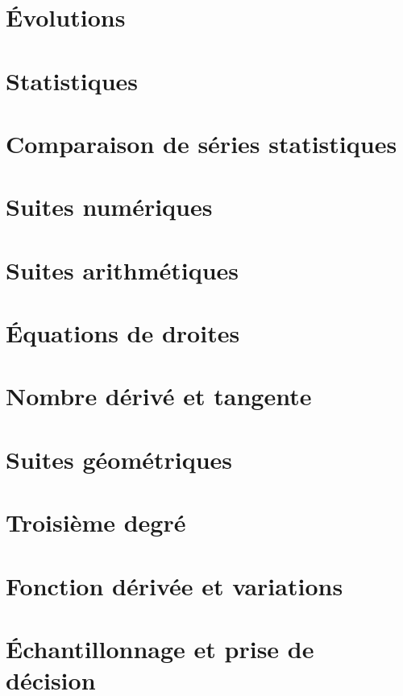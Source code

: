 \documentclass[a4paper,12pt]{book}
\begin{document}
\chapter{Évolutions}


\chapter{Statistiques}


\chapter{Comparaison de séries statistiques}


\chapter{Suites numériques}


\chapter{Suites arithmétiques}


\chapter{Équations de droites}


\chapter{Nombre dérivé et tangente}


\chapter{Suites géométriques}


\chapter{Troisième degré}


\chapter{Fonction dérivée et variations}


\chapter{Échantillonnage et prise de décision}

\end{document}
